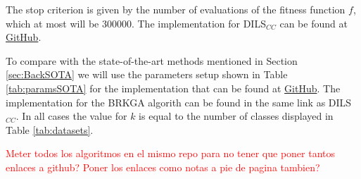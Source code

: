 \documentclass[review]{elsarticle}
\begin{document}
The stop criterion is given by the number of evaluations of the fitness function $f$, which at most will be 300000. The implementation for DILS$_{CC}$ can be found at \href{https://github.com/GermangUgr/DILS_CC}{GitHub}.

To compare with the state-of-the-art methods mentioned in Section \ref{sec:BackSOTA} we will use the parameters setup shown in Table \ref{tab:paramsSOTA} for the implementation that can be found at \href{https://github.com/GermangUgr/TFG/tree/master/Software}{GitHub}. The implementation for the BRKGA algorith can be found in the same link as DILS$_{CC}$. In all cases the value for $k$ is equal to the number of classes displayed in Table \ref{tab:datasets}.

\textcolor{red}{Meter todos los algoritmos en el mismo repo para no tener que poner tantos enlaces a github? Poner los enlaces como notas a pie de pagina tambien?}

\begin{table}[!h]
	\centering
	\setlength{\tabcolsep}{7pt}
	\renewcommand{\arraystretch}{1.4}
		
	\caption{Parameters setup used for the state-of-the-art algorithms.}
	\label{tab:paramsSOTA}
\end{table}
\end{document}
